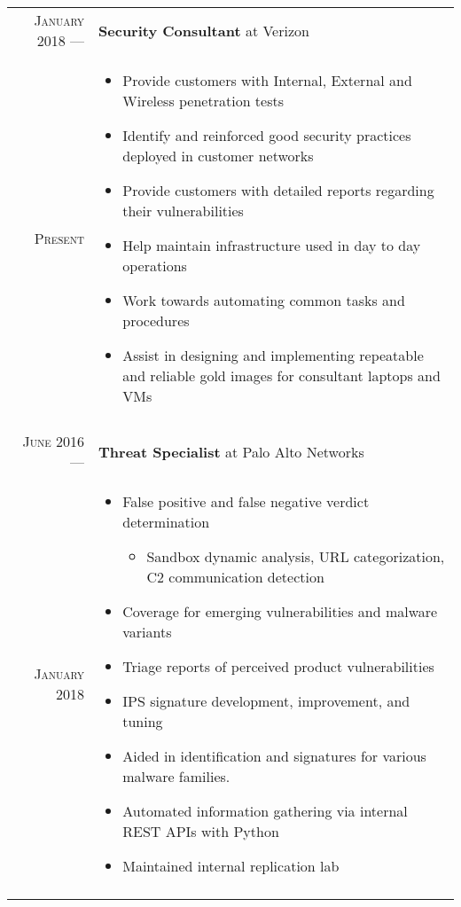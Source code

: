 \documentclass[a4paper,10pt]{article}
\begin{document}
\begin{tabular}{r|p{11cm}}

 \textsc{January 2018} ---            & \textbf {Security Consultant} at Verizon \\
 \textsc{Present} \hphantom{---} & \footnotesize{
        \vspace{-2mm}
        \begin{itemize}[leftmargin=*]
            \item Provide customers with Internal, External and Wireless penetration tests
            \item Identify and reinforced good security practices deployed in customer networks
            \item Provide customers with detailed reports regarding their vulnerabilities
            \item Help maintain infrastructure used in day to day operations
            \item Work towards automating common tasks and procedures
            \item Assist in designing and implementing repeatable and reliable gold images for consultant laptops and VMs
        \end{itemize}
        \vspace*{-\baselineskip}
    }\\
 \multicolumn{2}{c}{} \\

 \textsc{June 2016} ---            & \textbf {Threat Specialist} at Palo Alto Networks \\
 \textsc{January 2018} \hphantom{---} & \footnotesize{
        \vspace{-2mm}
        \begin{itemize}[leftmargin=*]
            \item False positive and false negative verdict determination
            \begin{itemize}
                \item Sandbox dynamic analysis, URL categorization, C2 communication detection
            \end{itemize}
            \item Coverage for emerging vulnerabilities and malware variants
            \item Triage reports of perceived product vulnerabilities 
            \item IPS signature development, improvement, and tuning 
            \item Aided in identification and signatures for various malware families.
            \item Automated information gathering via internal REST APIs with Python
            \item Maintained internal replication lab
        \end{itemize}
        \vspace*{-\baselineskip}
    }\\
 \multicolumn{2}{c}{} \\


\end{tabular}
\end{document}
